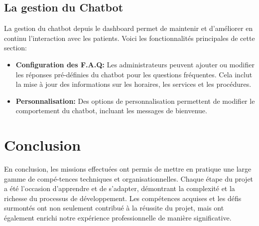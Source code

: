 \subsection{La gestion du Chatbot}

\hspace{16pt} La gestion du chatbot depuis le dashboard permet de maintenir et d’améliorer en continu l’interaction avec les patients. Voici les fonctionnalités principales de cette section:

\begin{itemize}
  \item \textbf{Configuration des F.A.Q: }Les administrateurs peuvent ajouter ou modifier les réponses pré-définies du chatbot pour les questions fréquentes. Cela inclut la mise à jour des informations sur les horaires, les services et les procédures.
  \item \textbf{Personnalisation: }Des options de personnalisation permettent de modifier le comportement du chatbot, incluant les messages de bienvenue.
\end{itemize}

\newpage

\section*{Conclusion}

\hspace{16pt}En conclusion, les missions effectuées ont permis de mettre en pratique une large gamme de compé-tences techniques et organisationnelles. Chaque étape du projet a été l'occasion d'apprendre et de s'adapter, démontrant la complexité et la richesse du processus de développement. Les compétences acquises et les défis surmontés ont non seulement contribué à la réussite du projet, mais ont également enrichi notre expérience professionnelle de manière significative.

\pagebreak

